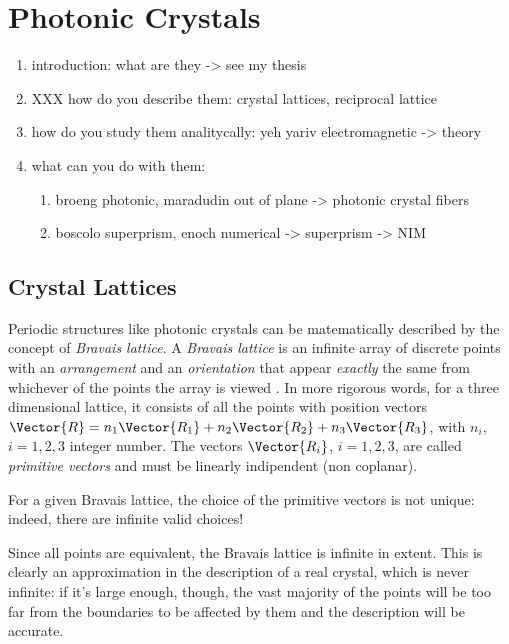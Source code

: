 \chapter{Photonic Crystals}

\begin{enumerate}
\item
  introduction: what are they -> see my thesis
\item
  XXX how do you describe them: crystal lattices, reciprocal lattice
\item
  how do you study them analitycally: yeh yariv electromagnetic -> theory
\item
  what can you do with them:
  \begin{enumerate}
    \item
      broeng photonic, maradudin out of plane -> photonic crystal
      fibers
    \item
      boscolo superprism, enoch numerical -> superprism -> NIM
  \end{enumerate}
\end{enumerate}

\section{Crystal Lattices}

Periodic structures like photonic crystals can be matematically
described by the concept of \emph{Bravais lattice}. A \emph{Bravais
  lattice} is an infinite array of discrete points with an
\emph{arrangement} and an \emph{orientation} that appear
\emph{exactly} the same from whichever of the points the array is
viewed . In more rigorous
words, for a three dimensional lattice, it consists of all the points
with position vectors $\Vector{R} = n_1 \Vector{R_1} + n_2
\Vector{R_2} + n_3 \Vector{R_3}$, with $n_i$, $i = 1,2,3$ integer
number. The vectors $\Vector{R_i}$, $i = 1,2,3$, are called
\emph{primitive vectors} and must be linearly indipendent (non
coplanar).

For a given Bravais lattice, the choice of the primitive vectors is
not unique: indeed, there are infinite valid choices!


Since all points are equivalent, the Bravais lattice is infinite in
extent. This is clearly an approximation in the description of a real
crystal, which is never infinite: if it's large enough, though, the
vast majority of the points will be too far from the boundaries to be
affected by them and the description will be accurate.

